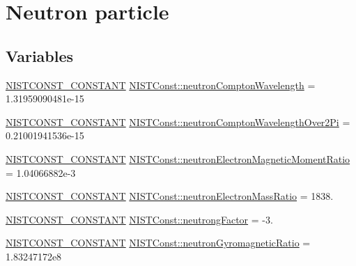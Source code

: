 \hypertarget{group___n_i_s_t_const-_neutron}{}\section{Neutron particle}
\label{group___n_i_s_t_const-_neutron}
\subsection*{Variables}
\begin{DoxyCompactItemize}
\item 
\mbox{\hyperlink{_n_i_s_t_const_8hpp_a2b0fc1d7452373f816175dd86ce26729}{N\+I\+S\+T\+C\+O\+N\+S\+T\+\_\+\+C\+O\+N\+S\+T\+A\+NT}} \mbox{\hyperlink{group___n_i_s_t_const-_neutron_gae051f50a8d39fb52c5ce761f9b0696ae}{N\+I\+S\+T\+Const\+::neutron\+Compton\+Wavelength}} = 1.\+31959090481e-\/15
\item 
\mbox{\hyperlink{_n_i_s_t_const_8hpp_a2b0fc1d7452373f816175dd86ce26729}{N\+I\+S\+T\+C\+O\+N\+S\+T\+\_\+\+C\+O\+N\+S\+T\+A\+NT}} \mbox{\hyperlink{group___n_i_s_t_const-_neutron_gadf551a9e4c9f1c8b81a0b0ffc854d02f}{N\+I\+S\+T\+Const\+::neutron\+Compton\+Wavelength\+Over2\+Pi}} = 0.\+21001941536e-\/15
\item 
\mbox{\hyperlink{_n_i_s_t_const_8hpp_a2b0fc1d7452373f816175dd86ce26729}{N\+I\+S\+T\+C\+O\+N\+S\+T\+\_\+\+C\+O\+N\+S\+T\+A\+NT}} \mbox{\hyperlink{group___n_i_s_t_const-_neutron_ga18e39275d61e889aada6523c0faedb28}{N\+I\+S\+T\+Const\+::neutron\+Electron\+Magnetic\+Moment\+Ratio}} = 1.\+04066882e-\/3
\item 
\mbox{\hyperlink{_n_i_s_t_const_8hpp_a2b0fc1d7452373f816175dd86ce26729}{N\+I\+S\+T\+C\+O\+N\+S\+T\+\_\+\+C\+O\+N\+S\+T\+A\+NT}} \mbox{\hyperlink{group___n_i_s_t_const-_neutron_gaed8ff3598a8de7256064056501b72e97}{N\+I\+S\+T\+Const\+::neutron\+Electron\+Mass\+Ratio}} = 1838.
\item 
\mbox{\hyperlink{_n_i_s_t_const_8hpp_a2b0fc1d7452373f816175dd86ce26729}{N\+I\+S\+T\+C\+O\+N\+S\+T\+\_\+\+C\+O\+N\+S\+T\+A\+NT}} \mbox{\hyperlink{group___n_i_s_t_const-_neutron_ga6391993dd3564c84df74dd3e9e245f4b}{N\+I\+S\+T\+Const\+::neutrong\+Factor}} = -\/3.
\item 
\mbox{\hyperlink{_n_i_s_t_const_8hpp_a2b0fc1d7452373f816175dd86ce26729}{N\+I\+S\+T\+C\+O\+N\+S\+T\+\_\+\+C\+O\+N\+S\+T\+A\+NT}} \mbox{\hyperlink{group___n_i_s_t_const-_neutron_gae41519ad6817ec697afb92b914ad0b14}{N\+I\+S\+T\+Const\+::neutron\+Gyromagnetic\+Ratio}} = 1.\+83247172e8
\item 

\end{DoxyCompactItemize}
